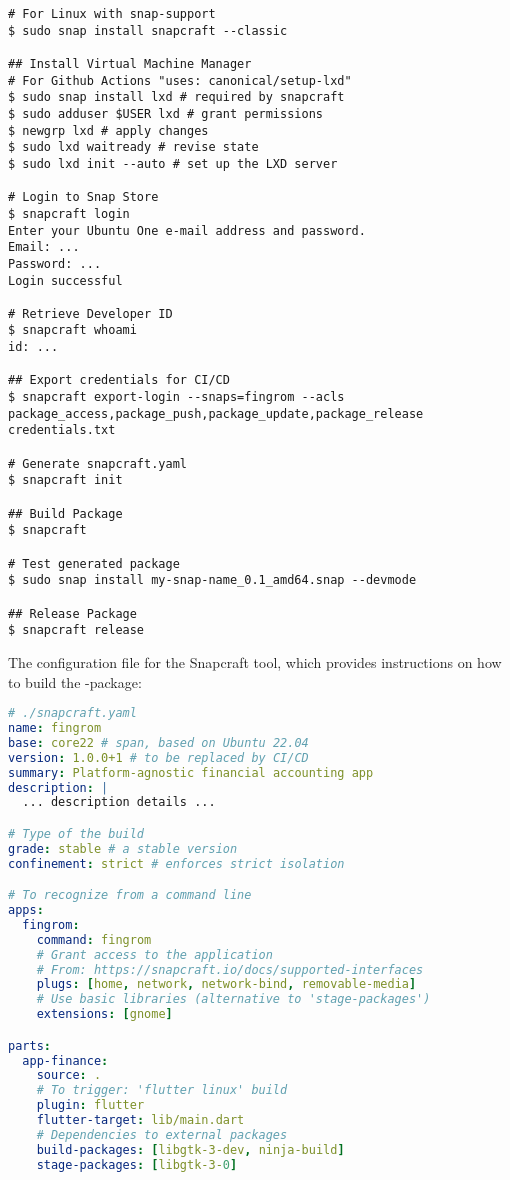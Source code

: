 \begin{lstlisting}[language=terminal]
# For Linux with snap-support
$ sudo snap install snapcraft --classic 

## Install Virtual Machine Manager
# For Github Actions "uses: canonical/setup-lxd"
$ sudo snap install lxd # required by snapcraft
$ sudo adduser $USER lxd # grant permissions
$ newgrp lxd # apply changes
$ sudo lxd waitready # revise state
$ sudo lxd init --auto # set up the LXD server

# Login to Snap Store
$ snapcraft login
Enter your Ubuntu One e-mail address and password.
Email: ...
Password: ...
Login successful 

# Retrieve Developer ID
$ snapcraft whoami
id: ...

## Export credentials for CI/CD
$ snapcraft export-login --snaps=fingrom --acls package_access,package_push,package_update,package_release credentials.txt

# Generate snapcraft.yaml
$ snapcraft init

## Build Package
$ snapcraft

# Test generated package
$ sudo snap install my-snap-name_0.1_amd64.snap --devmode

## Release Package
$ snapcraft release
\end{lstlisting}

\noindent The configuration file for the Snapcraft tool, which provides instructions on how to build the -package:

\begin{lstlisting}[language=yaml]
# ./snapcraft.yaml
name: fingrom
base: core22 # span, based on Ubuntu 22.04 
version: 1.0.0+1 # to be replaced by CI/CD
summary: Platform-agnostic financial accounting app
description: |
  ... description details ...

# Type of the build
grade: stable # a stable version
confinement: strict # enforces strict isolation

# To recognize from a command line
apps:
  fingrom:
    command: fingrom
    # Grant access to the application
    # From: https://snapcraft.io/docs/supported-interfaces
    plugs: [home, network, network-bind, removable-media]
    # Use basic libraries (alternative to 'stage-packages') 
    extensions: [gnome]

parts:
  app-finance:
    source: .
    # To trigger: 'flutter linux' build
    plugin: flutter
    flutter-target: lib/main.dart
    # Dependencies to external packages
    build-packages: [libgtk-3-dev, ninja-build]
    stage-packages: [libgtk-3-0]
\end{lstlisting}

